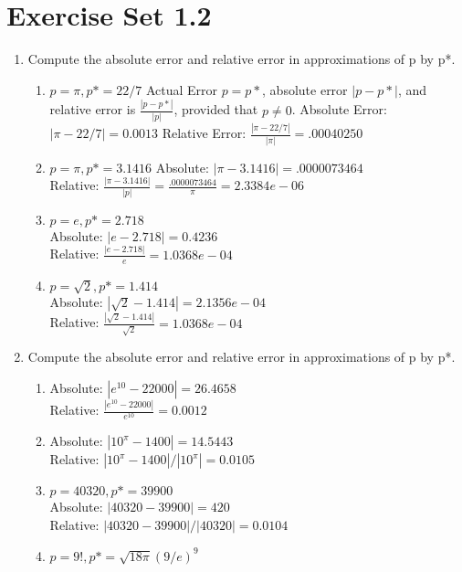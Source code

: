 \documentclass{article}
\begin{document}
\section{Exercise Set 1.2}
\begin{enumerate}
    \item Compute the absolute error and relative error in approximations of p by p*.
    \begin{enumerate}
        \item $p = \pi, p* = 22/7$
        Actual Error $p = p*$, absolute error $|p - p*|$, and relative error is $\frac{|p-p*|}{|p|}$,
        provided that $p\neq 0$. Absolute Error: $|\pi - 22/7| = 0.0013 $
        Relative Error: $\frac{|\pi - 22/7|}{|\pi|} = .00040250$
        \item $p = \pi, p* = 3.1416$
        Absolute: $|\pi - 3.1416| =.0000073464$\\
        Relative: $\frac{|\pi - 3.1416|}{|p|} =\frac{.0000073464}{\pi} = 2.3384e-06$
        \item $p = e, p* = 2.718$\\
        Absolute: $|e - 2.718| =0.4236 $\\
        Relative: $\frac{|e-2.718|}{e} =1.0368e-04 $\\
        \item $p = \sqrt{2}, p*=1.414$\\
        Absolute: $|\sqrt{2}-1.414| =  2.1356e-04 $\\
        Relative: $\frac{|\sqrt{2}-1.414|}{\sqrt{2}} =1.0368e-04$
    \end{enumerate}
    \item Compute the absolute error and relative error in approximations of p by p*.
    \begin{enumerate}
        \item Absolute: $|e^{10} - 22000| = 26.4658$\\
        Relative: $\frac{|e^{10} - 22000|}{e^{10}} = 0.0012$
        \item Absolute: $|10^{\pi} - 1400| = 14.5443 $\\
        Relative: $|10^{\pi} - 1400|/|10^{\pi}| = 0.0105$
        \item $p = 40320, p* = 39900$\\
        Absolute: $|40320-39900| = 420$\\
        Relative: $|40320-39900|/|40320| = 0.0104$
        \item $p = 9!, p* = \sqrt{18\pi}(9/e)^{9}$\\

\end{enumerate}
\end{enumerate}
\end{document}
